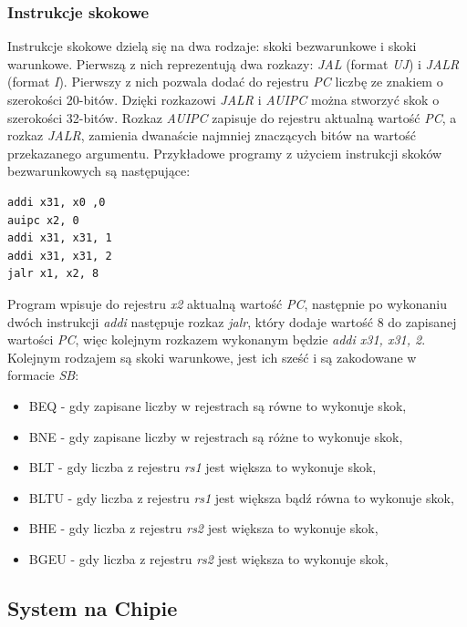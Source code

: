 \documentclass[11pt,a4paper]{article}
\begin{document}
		\subsubsection{Instrukcje skokowe}
		\hspace{5mm}
			Instrukcje skokowe dzielą się na dwa rodzaje: skoki bezwarunkowe i skoki warunkowe. Pierwszą z nich reprezentują dwa rozkazy: \textit{JAL} (format \textit{UJ}) i \textit{JALR} (format \textit{I}). Pierwszy z nich pozwala dodać do rejestru \textit{PC} liczbę ze znakiem o szerokości 20-bitów. Dzięki rozkazowi \textit{JALR} i \textit{AUIPC} można stworzyć skok o szerokości 32-bitów. Rozkaz \textit{AUIPC} zapisuje do rejestru aktualną wartość \textit{PC}, a rozkaz \textit{JALR}, zamienia dwanaście najmniej znaczących bitów na wartość przekazanego argumentu. Przykładowe programy z użyciem instrukcji skoków bezwarunkowych są następujące:
				\begin{lstlisting}[language=Ant]
addi x31, x0 ,0
auipc x2, 0
addi x31, x31, 1
addi x31, x31, 2
jalr x1, x2, 8
			\end{lstlisting}
			Program wpisuje do rejestru \textit{x2} aktualną wartość \textit{PC}, następnie po wykonaniu dwóch instrukcji \textit{addi} następuje rozkaz \textit{jalr}, który dodaje wartość 8 do zapisanej wartości \textit{PC}, więc kolejnym rozkazem wykonanym będzie \textit{addi x31, x31, 2}.
			\\
			Kolejnym rodzajem są skoki warunkowe, jest ich sześć i są zakodowane w formacie \textit{SB}:
			\begin{itemize}
				\item BEQ - gdy zapisane liczby w rejestrach są równe to wykonuje skok,
				\item BNE - gdy zapisane liczby w rejestrach są różne to wykonuje skok,
				\item BLT - gdy liczba z rejestru \textit{rs1} jest większa to wykonuje skok,
				\item BLTU - gdy liczba z rejestru \textit{rs1} jest większa bądź równa to wykonuje skok,
				\item BHE - gdy liczba z rejestru \textit{rs2} jest większa to wykonuje skok,
				\item BGEU - gdy liczba z rejestru \textit{rs2} jest większa to wykonuje skok,
			\end{itemize}
	\subsection{System na Chipie}
\end{document}
